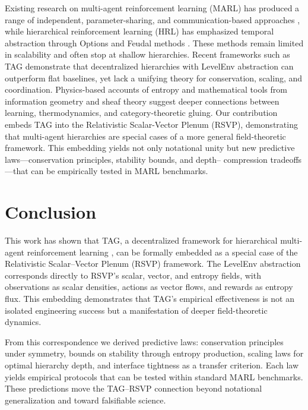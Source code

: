 \documentclass[11pt,a4paper]{article}
\begin{document}
Existing research on multi-agent reinforcement learning (MARL) has produced a
range of independent, parameter-sharing, and communication-based approaches
\citep{samvelyan2019pymarl, terry2021pettingzoo, bettini2024benchmarl}, while
hierarchical reinforcement learning (HRL) has emphasized temporal abstraction
through Options \citep{sutton1999between} and Feudal methods
\citep{dayan1992feudal, vezhnevets2017feudal}. These methods remain limited in
scalability and often stop at shallow hierarchies. Recent frameworks such as
TAG \citep{paolo2025tag} demonstrate that decentralized hierarchies with
LevelEnv abstraction can outperform flat baselines, yet lack a unifying theory
for conservation, scaling, and coordination. Physics-based accounts of entropy
\citep{jacobson1995thermodynamics, verlinde2011origin, carney2022gravity} and
mathematical tools from information geometry \citep{amari2016information} and
sheaf theory \citep{maclane1992sheaves, curry2021sheaflearning} suggest deeper
connections between learning, thermodynamics, and category-theoretic gluing.
Our contribution embeds TAG into the Relativistic Scalar-Vector Plenum (RSVP),
demonstrating that multi-agent hierarchies are special cases of a more general
field-theoretic framework. This embedding yields not only notational unity but
new predictive laws—conservation principles, stability bounds, and depth–
compression tradeoffs—that can be empirically tested in MARL benchmarks.

\section{Conclusion}

This work has shown that TAG, a decentralized framework for hierarchical
multi-agent reinforcement learning \citep{paolo2025tag}, can be formally
embedded as a special case of the Relativistic Scalar–Vector Plenum (RSVP)
framework. The LevelEnv abstraction corresponds directly to RSVP’s scalar,
vector, and entropy fields, with observations as scalar densities, actions as
vector flows, and rewards as entropy flux. This embedding demonstrates that
TAG’s empirical effectiveness is not an isolated engineering success but a
manifestation of deeper field-theoretic dynamics.

From this correspondence we derived predictive laws: conservation principles
under symmetry, bounds on stability through entropy production, scaling laws for
optimal hierarchy depth, and interface tightness as a transfer criterion. Each
law yields empirical protocols that can be tested within standard MARL
benchmarks. These predictions move the TAG–RSVP connection beyond notational
generalization and toward falsifiable science.
\end{document}
